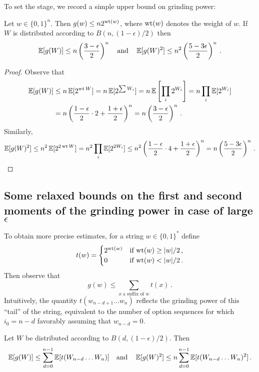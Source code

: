 
To set the stage, we record a simple upper bound on grinding power:
\begin{proposition}\label{prop:praos-moments-simple}
  Let $w \in \{0,1\}^n$. Then $g(w) \leq n 2^{\operatorname{wt}(w)}$, where $\operatorname{wt}(w)$ denotes the weight of $w$. If $W$ is distributed according to $B(n,(1 - \epsilon)/2)$ then
  \[
    \operatorname{\mathbb{E}}[g(W)] \leq n \left(\frac{3 - \epsilon}{2}\right)^n \quad\text{and}\quad\operatorname{\mathbb{E}}[g(W)^2] \leq n^2\left(\frac{5 - 3\epsilon}{2}\right)^n\,.
  \]
\end{proposition}

\begin{proof}
  Observe that
  \begin{align*}
    \operatorname{\mathbb{E}}[g(W)] 
    &\leq n\operatorname{\mathbb{E}}[2^{\operatorname{wt}{W}}] 
    = n\operatorname{\mathbb{E}}[2^{\sum W_i}] 
    = n\operatorname{\mathbb{E}}\left[\prod_i 2^{W_i}\right] 
    = n\prod_i \operatorname{\mathbb{E}}[2^{W_i}] \\
    &= n \left( \frac{1-\epsilon}{2} \cdot 2 + \frac{1 + \epsilon}{2}\right)^n 
    = n \left(\frac{3 - \epsilon}{2}\right)^n\,.
  \end{align*}
    Similarly,
  \[
    \operatorname{\mathbb{E}}[g(W)^2] \leq n^2 \operatorname{\mathbb{E}}[2^{2\operatorname{wt}{W}}] = n^2\prod_i \operatorname{\mathbb{E}}[2^{2W_i}] \leq n^2\left( \frac{1-\epsilon}{2} \cdot 4 + \frac{1 + \epsilon}{2}\right)^n = n \left(\frac{5 - 3\epsilon}{2}\right)^n\,.\qedhere
  \]
\end{proof}

\subsection{Some relaxed bounds on the first and second moments of the grinding power in case of large $\epsilon$
}
To obtain more precise estimates, for a string $w \in \{0,1\}^*$ define
\[
  t(w) = \begin{cases}
    2^{\operatorname{wt}(w)} & \text{if $\operatorname{wt}(w) \geq |w|/2$\,,}\\
    0 & \text{if $\operatorname{wt}(w) < |w|/2$\,.}
  \end{cases}
\]
Then observe that
\begin{equation}\label{eq:g-decomposition}
  g(w) \leq \sum_{x\; \text{a suffix of $w$}} t(x)\,.
\end{equation}
Intuitively, the quantity $t(w_{n-d+1} \ldots w_n)$ reflects the grinding power of this ``tail'' of the string, equivalent to the number of option sequences for which $i_0 = n-d$ favorably assuming that $w_{n-d} = 0$.
\begin{proposition}\label{prop:moments-general}
  Let $W$ be distributed according to $B(d,(1 - \epsilon)/2)$. Then
  \[
    \operatorname{\mathbb{E}}[g(W)] \leq \sum_{d = 0}^{n-1} \operatorname{\mathbb{E}}[t(W_{n-d} \ldots W_n)] \quad \text{and}\quad \operatorname{\mathbb{E}}[g(W)^2] \leq n \sum_{d = 0}^{n-1} \operatorname{\mathbb{E}}[t(W_{n-d} \ldots W_n)^2]\,.
  \]
\end{proposition}

